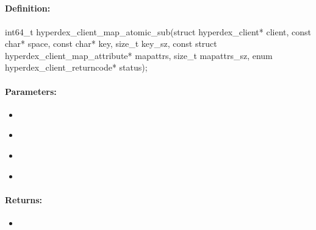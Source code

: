 \pagebreak
\subsection{}
\label{api:c:map_atomic_sub}


\paragraph{Definition:}
\begin{ccode}
int64_t hyperdex_client_map_atomic_sub(struct hyperdex_client* client,
        const char* space,
        const char* key, size_t key_sz,
        const struct hyperdex_client_map_attribute* mapattrs, size_t mapattrs_sz,
        enum hyperdex_client_returncode* status);
\end{ccode}

\paragraph{Parameters:}
\begin{itemize}[noitemsep]
\item {}\\

\item {}\\

\item {}\\

\item {}\\

\end{itemize}

\paragraph{Returns:}
\begin{itemize}[noitemsep]
\item {}\\

\end{itemize}

